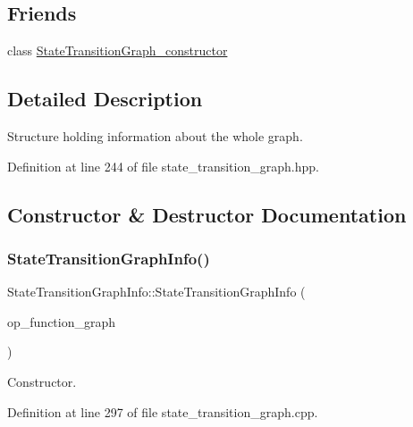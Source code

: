 \subsection*{Friends}
\begin{DoxyCompactItemize}
\item 
class \hyperlink{structStateTransitionGraphInfo_ad763807d92353814f2f1e7839d7eb408}{State\+Transition\+Graph\+\_\+constructor}
\end{DoxyCompactItemize}


\subsection{Detailed Description}
Structure holding information about the whole graph. 

Definition at line 244 of file state\+\_\+transition\+\_\+graph.\+hpp.



\subsection{Constructor \& Destructor Documentation}
\mbox{\label{structStateTransitionGraphInfo_adde59e509275b80c1736092fc3c1448a}} 
\subsubsection{\texorpdfstring{State\+Transition\+Graph\+Info()}{StateTransitionGraphInfo()}}
{\footnotesize\ttfamily State\+Transition\+Graph\+Info\+::\+State\+Transition\+Graph\+Info (\begin{DoxyParamCaption}\item[{const \hyperlink{op__graph_8hpp_a9a0b240622c47584bee6951a6f5de746}{Op\+Graph\+Const\+Ref}}]{op\+\_\+function\+\_\+graph }\end{DoxyParamCaption})\hspace{0.3cm}{\ttfamily [explicit]}}



Constructor. 



Definition at line 297 of file state\+\_\+transition\+\_\+graph.\+cpp.



